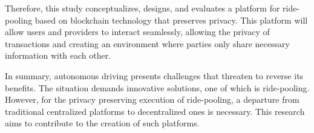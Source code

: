 Therefore, this study conceptualizes, designs, and evaluates a platform for ride-pooling based on  blockchain technology that preserves privacy. This platform will allow users and providers to interact seamlessly, allowing the privacy of transactions and creating an environment where parties only share necessary information with each other.

In summary, autonomous driving presents challenges that threaten to reverse its benefits. The situation demands innovative solutions, one of which is ride-pooling. However, for the privacy preserving execution of ride-pooling, a departure from traditional centralized platforms to decentralized ones is necessary. This research aims to contribute to the creation of such platforms.




